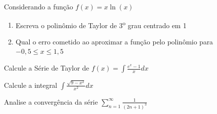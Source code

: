 \documentclass[a4paper,12pt,fleqn]{article}
\begin{document}

\vspace{\baselineskip}
Considerando a função \(f(x) = x\ln(x)\)
\begin{enumerate}[label=\alph*)]
  \item Escreva o polinômio de Taylor de 3\textsuperscript{o} grau centrado em 1
  \item Qual o erro cometido ao aproximar a função pelo polinômio para
  \(-0,5\leq x \leq 1,5\)
\end{enumerate}

\begin{answer}
\end{answer}

\vspace{\baselineskip}
Calcule a Série de Taylor de \(f(x) = \int\frac{e^x-1}{x}dx\)

\begin{answer}
\end{answer}

\vspace{\baselineskip}
Calcule a integral \(\int \frac{\sqrt{9-x^2}}{x^2}dx\)

\begin{answer}
\end{answer}

\vspace{\baselineskip}
Analise a convergência da série
\(
  \sum_{n=1}^\infty \frac{1}{\left(2n+1\right)^3}
\)

\begin{answer}
\end{answer}

\end{document}
